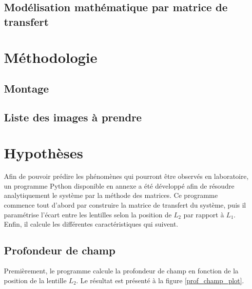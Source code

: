 \documentclass[11pt,letterpaper]{article}
\begin{document}

\subsection{Modélisation mathématique par matrice de transfert}

\section{Méthodologie}

\subsection{Montage}



\subsection{Liste des images à prendre}

\section{Hypothèses}


Afin de pouvoir prédire les phénomènes qui pourront être observés en laboratoire, un
programme Python disponible en annexe a été développé afin de résoudre analytiquement
le système par la méthode des matrices. Ce programme commence tout d'abord par construire
la matrice de transfert du système, puis il paramétrise l'écart entre les lentilles selon
la position de $L_2$ par rapport à $L_1$. Enfin, il calcule les différentes caractéristiques
qui suivent.

\subsection{Profondeur de champ}

Premièrement, le programme calcule la profondeur de champ en fonction de la position de
la lentille $L_2$. Le résultat est présenté à la figure \ref{prof_champ_plot}.
\end{document}
